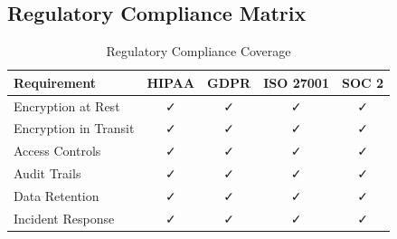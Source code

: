 \documentclass[12pt,a4paper]{article}
\begin{document}
\subsection{Regulatory Compliance Matrix}

\begin{table}[h]
\centering
\begin{tabular}{|l|c|c|c|c|}
\hline
\textbf{Requirement} & \textbf{HIPAA} & \textbf{GDPR} & \textbf{ISO 27001} & \textbf{SOC 2} \\
\hline
Encryption at Rest & ✓ & ✓ & ✓ & ✓ \\
\hline
Encryption in Transit & ✓ & ✓ & ✓ & ✓ \\
\hline
Access Controls & ✓ & ✓ & ✓ & ✓ \\
\hline
Audit Trails & ✓ & ✓ & ✓ & ✓ \\
\hline
Data Retention & ✓ & ✓ & ✓ & ✓ \\
\hline
Incident Response & ✓ & ✓ & ✓ & ✓ \\
\hline
\end{tabular}
\caption{Regulatory Compliance Coverage}
\end{table}
\end{document}
